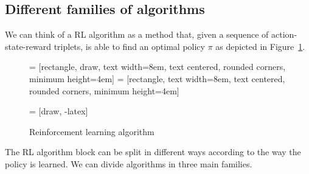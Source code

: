 \subsection{Different families of algorithms}
We can think of a RL algorithm as a method that, given a sequence of action-state-reward triplets, is able to find an optimal policy $\pi$ as depicted in Figure~\ref{fig:rlalg-general}.
\begin{figure} [ht]
     = [rectangle, draw, 
        text width=8em, text centered, rounded corners, minimum height=4em]
     = [rectangle, 
        text width=8em, text centered, rounded corners, minimum height=4em]
        
     = [draw, -latex]
    \centering
    \caption{Reinforcement learning algorithm}
    \label{fig:rlalg-general}
\end{figure}
The RL algorithm block can be split in different ways according to the way the policy is learned. We can divide algorithms in three main families.


